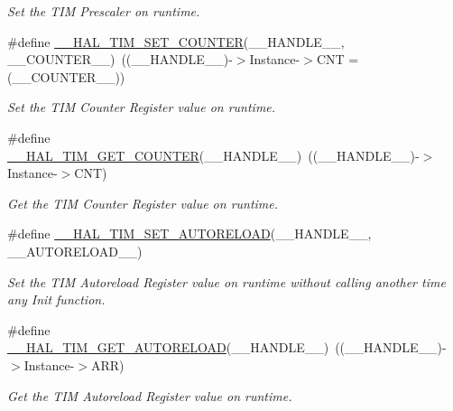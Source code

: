\begin{DoxyCompactItemize}
\begin{DoxyCompactList}\small\item\em Set the T\+IM Prescaler on runtime. \end{DoxyCompactList}\item 
\#define \hyperlink{group___t_i_m___exported___macros_ga9746ac75e4cd25cec1a9ebac8cb82b97}{\+\_\+\+\_\+\+H\+A\+L\+\_\+\+T\+I\+M\+\_\+\+S\+E\+T\+\_\+\+C\+O\+U\+N\+T\+ER}(\+\_\+\+\_\+\+H\+A\+N\+D\+L\+E\+\_\+\+\_\+,  \+\_\+\+\_\+\+C\+O\+U\+N\+T\+E\+R\+\_\+\+\_\+)~((\+\_\+\+\_\+\+H\+A\+N\+D\+L\+E\+\_\+\+\_\+)-\/$>$Instance-\/$>$C\+NT = (\+\_\+\+\_\+\+C\+O\+U\+N\+T\+E\+R\+\_\+\+\_\+))
\begin{DoxyCompactList}\small\item\em Set the T\+IM Counter Register value on runtime. \end{DoxyCompactList}\item 
\#define \hyperlink{group___t_i_m___exported___macros_gaf1af08014b9d06efbbb091d58d47c8ba}{\+\_\+\+\_\+\+H\+A\+L\+\_\+\+T\+I\+M\+\_\+\+G\+E\+T\+\_\+\+C\+O\+U\+N\+T\+ER}(\+\_\+\+\_\+\+H\+A\+N\+D\+L\+E\+\_\+\+\_\+)~((\+\_\+\+\_\+\+H\+A\+N\+D\+L\+E\+\_\+\+\_\+)-\/$>$Instance-\/$>$C\+NT)
\begin{DoxyCompactList}\small\item\em Get the T\+IM Counter Register value on runtime. \end{DoxyCompactList}\item 
\#define \hyperlink{group___t_i_m___exported___macros_ga1e6300cab1e34ecaaf490dc7d4812d69}{\+\_\+\+\_\+\+H\+A\+L\+\_\+\+T\+I\+M\+\_\+\+S\+E\+T\+\_\+\+A\+U\+T\+O\+R\+E\+L\+O\+AD}(\+\_\+\+\_\+\+H\+A\+N\+D\+L\+E\+\_\+\+\_\+,  \+\_\+\+\_\+\+A\+U\+T\+O\+R\+E\+L\+O\+A\+D\+\_\+\+\_\+)
\begin{DoxyCompactList}\small\item\em Set the T\+IM Autoreload Register value on runtime without calling another time any Init function. \end{DoxyCompactList}\item 
\#define \hyperlink{group___t_i_m___exported___macros_gaa7a5c7645695bad15bacd402513a028a}{\+\_\+\+\_\+\+H\+A\+L\+\_\+\+T\+I\+M\+\_\+\+G\+E\+T\+\_\+\+A\+U\+T\+O\+R\+E\+L\+O\+AD}(\+\_\+\+\_\+\+H\+A\+N\+D\+L\+E\+\_\+\+\_\+)~((\+\_\+\+\_\+\+H\+A\+N\+D\+L\+E\+\_\+\+\_\+)-\/$>$Instance-\/$>$A\+RR)
\begin{DoxyCompactList}\small\item\em Get the T\+IM Autoreload Register value on runtime. \end{DoxyCompactList}\item 

\end{DoxyCompactItemize}
